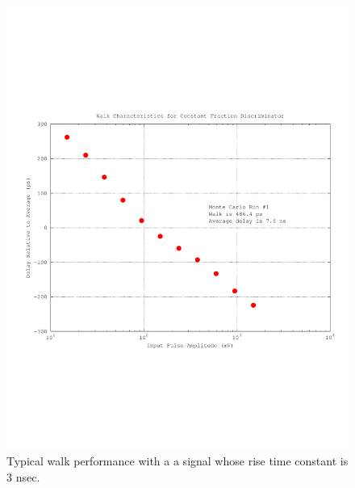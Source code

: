 \documentclass[12pt,oneside,final]{siuethesis}
\theoremstyle{definition}
\begin{document}
\begin{figure}[htbp!]
	\centering
 	\includegraphics[scale=0.7,keepaspectratio=true]{../Design_Reports/CFD_circuit_report/images/typical_walk.pdf} 	
 	\caption{Typical walk performance with a a signal whose rise time constant is 3 nsec.}
 	\label{FIG:TYPICAL_WALK}
\end{figure}
\end{document}
